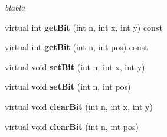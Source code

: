 \begin{DoxyCompactItemize}
\begin{DoxyCompactList}\small\item\em blabla \end{DoxyCompactList}\item 
\hypertarget{class_bitboard_a389593cc6921d71f5d9b15d551d3f303}{virtual int {\bfseries get\+Bit} (int n, int x, int y) const }\label{class_bitboard_a389593cc6921d71f5d9b15d551d3f303}

\item 
\hypertarget{class_bitboard_a4f966e7856d6ca00e2f3ff9c60b84fa1}{virtual int {\bfseries get\+Bit} (int n, int pos) const }\label{class_bitboard_a4f966e7856d6ca00e2f3ff9c60b84fa1}

\item 
\hypertarget{class_bitboard_ac4e0310c5f4358c6a2324188c331baa6}{virtual void {\bfseries set\+Bit} (int n, int x, int y)}\label{class_bitboard_ac4e0310c5f4358c6a2324188c331baa6}

\item 
\hypertarget{class_bitboard_a719be7dc22698d1d6d9138ac9875328e}{virtual void {\bfseries set\+Bit} (int n, int pos)}\label{class_bitboard_a719be7dc22698d1d6d9138ac9875328e}

\item 
\hypertarget{class_bitboard_a682fc651de10664e2d0c6583609897c1}{virtual void {\bfseries clear\+Bit} (int n, int x, int y)}\label{class_bitboard_a682fc651de10664e2d0c6583609897c1}

\item 
\hypertarget{class_bitboard_a54b8503679ef35d587a6624fd910d934}{virtual void {\bfseries clear\+Bit} (int n, int pos)}\label{class_bitboard_a54b8503679ef35d587a6624fd910d934}


\end{DoxyCompactItemize}
